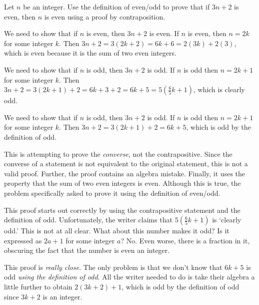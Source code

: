 \begin{eval}
Let $n$ be an integer. 
Use the definition of even/odd to 
prove that if $3n+2$ is even, then $n$ is even using a proof by contraposition.
\begin{spfenum}
\item
We need to show that if $n$ is even, then $3n+2$ is even.
If $n$ is even, then $n=2k$ for some integer $k$.  
Then $3n+2= 3(2k+2) = 6k+6=2(3k)+2(3)$, which is even because it is the sum of two even integers. \\
\evallinethree
\item
We need to show that if $n$ is odd, then $3n+2$ is odd.  
If $n$ is odd then $n=2k+1$ for some integer $k$.
Then $3n+2=3(2k+1)+2
=6k+3+2
=6k+5
=5(\frac{6}{5}k+1)$, which is clearly odd. \\
\evallinethree
\item
We need to show that if $n$ is odd, then $3n+2$ is odd.  If $n$ is odd then $n=2k+1$ for some integer $k$.
Then $3n+2=3(2k+1)+2
=6k+5$,
which is odd by the definition of odd. \\
\evallinethree
\end{spfenum}
\begin{answer}
\begin{pfevalenum}
\item
This is attempting to prove the {\em converse}, not the contrapositive.
Since the converse of a statement is not equivalent to the original statement, this is not a valid proof.
Further, the proof contains an algebra mistake.
Finally, it uses the property that the sum of two even integers is even.  Although this is true, the problem
specifically asked to prove it using the definition of even/odd.
\item
This proof starts out correctly by using the contrapositive statement and the definition of odd.
Unfortunately, the writer claims that $\displaystyle 5(\frac{6}{5}k+1)$ is `clearly odd.'
This is not at all clear.  What about this number makes it odd?  Is it expressed as $2a+1$ for
some integer $a$?  No.  
Even worse, there is a fraction in it, obscuring the fact that the number is even an integer.
\item
This proof is {\em really close}.  The only problem is that we don't know that $6k+5$ is odd 
{\em using the definition of odd}.  All the writer needed to do is take their algebra a little
further to obtain $2(3k+2)+1$, which is odd by the definition of odd since $3k+2$ is an integer.
\end{pfevalenum}
\end{answer}
\end{eval}

